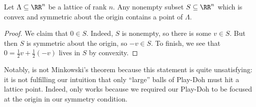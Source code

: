 \documentclass[../notes.tex]{subfiles}
\begin{document}
\begin{proposition} \label{prop:easy-minkowski}
	Let $\Lambda\subseteq\RR^n$ be a lattice of rank $n$. Any nonempty subset $S\subseteq\RR^n$ which is convex and symmetric about the origin contains a point of $\Lambda$.
\end{proposition}
\begin{proof}
	We claim that $0\in S$. Indeed, $S$ is nonempty, so there is some $v\in S$. But then $S$ is symmetric about the origin, so $-v\in S$. To finish, we see that $0=\frac12v+\frac12(-v)$ lives in $S$ by convexity.
\end{proof}
Notably,  is not Minkowski's theorem because this statement is quite unsatisfying: it is not fulfilling our intuition that only ``large'' balls of Play-Doh must hit a lattice point. Indeed,  only works because we required our Play-Doh to be focused at the origin in our symmetry condition.
\end{document}
